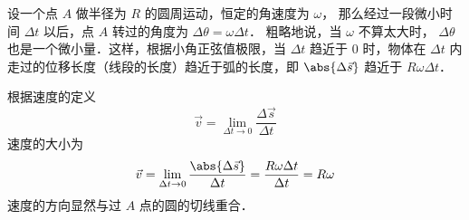 

设一个点 $A$ 做半径为 $R$ 的圆周运动，恒定的角速度为 $\omega $， 那么经过一段微小时间 $\Delta t$ 以后，点 $A$ 转过的角度为 $\Delta \theta  = \omega \Delta t$． 粗略地说，当 $\omega $ 不算太大时， $\Delta \theta $ 也是一个微小量．这样，根据小角正弦值极限，当 $\Delta t$ 趋近于 $0$ 时，物体在 $\Delta t$ 内走过的位移长度（线段的长度）趋近于弧的长度，即 $\abs{\Delta \vec s}$ 趋近于 $R\omega \Delta t$． 

根据速度的定义 
\begin{equation}
\vec v = \lim_{\Delta t \to 0} \frac{\Delta \vec s}{\Delta t}
\end{equation}
速度的大小为
\begin{equation}
\vec v = \lim_{\Delta t \to 0} \frac{\abs{\Delta \vec s}}{\Delta t} = \frac{R\omega \Delta t}{\Delta t} = R\omega 
\end{equation}
速度的方向显然与过 $A$ 点的圆的切线重合．











